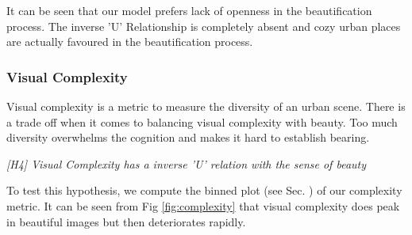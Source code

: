 
It can be seen that our model prefers lack of openness in the beautification process. The inverse 'U' Relationship is completely absent and cozy urban places are actually favoured in the beautification process. 



\subsubsection{Visual Complexity }
Visual complexity is a metric to measure the diversity of an urban scene. There is a trade off  when it comes to balancing visual complexity with beauty. Too much diversity overwhelms the cognition and makes it hard to establish bearing. 
\par
\textit{[H4] Visual Complexity has a inverse 'U' relation with the sense of beauty }
\par

To test  this hypothesis, we compute the binned plot (see Sec. \label{sec:privacy}) of our complexity metric. It can be seen from Fig \ref{fig:complexity} that visual complexity does peak in beautiful images but then deteriorates rapidly.



